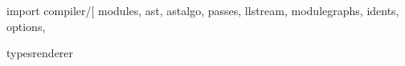 \documentclass[a4paper,12pt]{article}
\date{\today}
\title{}
\begin{document}
\tableofcontents

\begin{range-begin}
import compiler/[
  modules,
  ast,
  astalgo,
  passes,
  llstream,
  modulegraphs,
  idents,
  options,

typesrenderer
\end{range-begin}
\end{document}
